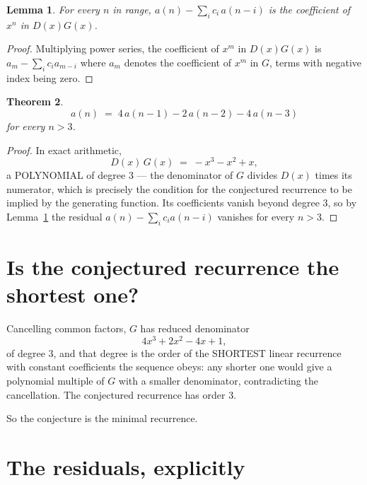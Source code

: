 \documentclass[11pt,a4paper]{article}
\theoremstyle{plain}
\newtheorem{theorem}{Theorem}
\newtheorem{lemma}[theorem]{Lemma}
\theoremstyle{definition}
\begin{document}
\begin{lemma}\label{lem:key}
For every $n$ in range, $a(n)-\sum_i c_i\,a(n-i)$ is the coefficient of $x^{n}$ in
$D(x)G(x)$.
\end{lemma}

\begin{proof}
Multiplying power series, the coefficient of $x^{m}$ in $D(x)G(x)$ is
$a_m-\sum_i c_i a_{m-i}$ where $a_m$ denotes the coefficient of $x^{m}$ in $G$, terms with
negative index being zero.
\end{proof}

\begin{theorem}
\[
a(n)\;=\;4\,a(n-1) - 2\,a(n-2) - 4\,a(n-3)
\]
for every $n>3$.
\end{theorem}

\begin{proof}
In exact arithmetic,
\[
D(x)\,G(x)\;=\;- x^{3} - x^{2} + x,
\]
a POLYNOMIAL of degree $3$ --- the denominator of $G$ divides $D(x)$ times its numerator,
which is precisely the condition for the conjectured recurrence to be implied by the
generating function. Its coefficients vanish beyond degree $3$, so by
Lemma~\ref{lem:key} the residual $a(n)-\sum_ic_ia(n-i)$ vanishes for every
$n>3$.
\end{proof}

\section{Is the conjectured recurrence the shortest one?}

Cancelling common factors, $G$ has reduced denominator
\[
4 x^{3} + 2 x^{2} - 4 x + 1,
\]
of degree $3$, and that degree is the order of the SHORTEST linear recurrence with
constant coefficients the sequence obeys: any shorter one would give a polynomial multiple of
$G$ with a smaller denominator, contradicting the cancellation. The conjectured recurrence has
order $3$.

So the conjecture is the minimal recurrence.

\section{The residuals, explicitly}
\end{document}
